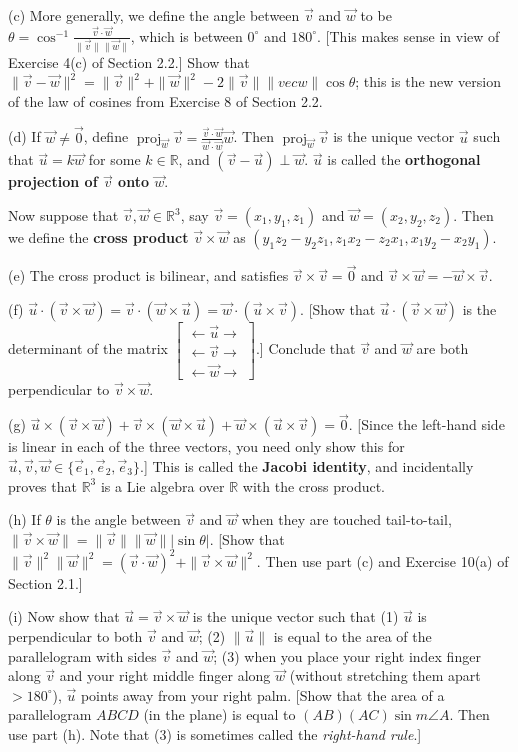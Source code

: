 \documentclass[leqno]{book}
\begin{document}
\begin{enumerate}
(c) More generally, we define the angle between $\vec v$ and $\vec w$ to be $\theta=\cos^{-1}\frac{\vec v\cdot\vec w}{\|\vec v\|\|\vec w\|}$, which is between $0^\circ$ and $180^\circ$.  [This makes sense in view of Exercise 4(c) of Section 2.2.]  Show that $\|\vec v-\vec w\|^2=\|\vec v\|^2+\|\vec w\|^2-2\|\vec v\|\|vec w\|\cos\theta$; this is the new version of the law of cosines from Exercise 8 of Section 2.2.

(d) If $\vec w\ne\vec 0$, define $\operatorname{proj}_{\vec w}\vec v=\frac{\vec v\cdot\vec w}{\vec w\cdot\vec w}\vec w$.  Then $\operatorname{proj}_{\vec w}\vec v$ is the unique vector $\vec u$ such that $\vec u=k\vec w$ for some $k\in\mathbb R$, and $(\vec v-\vec u)\perp\vec w$.  $\vec u$ is called the \textbf{orthogonal projection of $\vec v$ onto $\vec w$}.

Now suppose that $\vec v,\vec w\in\mathbb R^3$, say $\vec v=(x_1,y_1,z_1)$ and $\vec w=(x_2,y_2,z_2)$.  Then we define the \textbf{cross product} $\vec v\times\vec w$ as $(y_1z_2-y_2z_1,z_1x_2-z_2x_1,x_1y_2-x_2y_1)$.

(e) The cross product is bilinear, and satisfies $\vec v\times\vec v=\vec 0$ and $\vec v\times\vec w=-\vec w\times\vec v$.

(f) $\vec u\cdot(\vec v\times\vec w)=\vec v\cdot(\vec w\times\vec u)=\vec w\cdot(\vec u\times\vec v)$.  [Show that $\vec u\cdot(\vec v\times\vec w)$ is the determinant of the matrix $\begin{bmatrix}\leftarrow\vec u\rightarrow\\\leftarrow\vec v\rightarrow\\\leftarrow\vec w\rightarrow\end{bmatrix}$.]  Conclude that $\vec v$ and $\vec w$ are both perpendicular to $\vec v\times\vec w$.

(g) $\vec u\times(\vec v\times\vec w)+\vec v\times(\vec w\times\vec u)+\vec w\times(\vec u\times\vec v)=\vec 0$.  [Since the left-hand side is linear in each of the three vectors, you need only show this for $\vec u,\vec v,\vec w\in\{\vec e_1,\vec e_2,\vec e_3\}$.]  This is called the \textbf{Jacobi identity}, and incidentally proves that $\mathbb R^3$ is a Lie algebra over $\mathbb R$ with the cross product.

(h) If $\theta$ is the angle between $\vec v$ and $\vec w$ when they are touched tail-to-tail, $\|\vec v\times\vec w\|=\|\vec v\|\|\vec w\||\sin\theta|$.  [Show that $\|\vec v\|^2\|\vec w\|^2=(\vec v\cdot\vec w)^2+\|\vec v\times\vec w\|^2$.  Then use part (c) and Exercise 10(a) of Section 2.1.]

(i) Now show that $\vec u=\vec v\times\vec w$ is the unique vector such that (1) $\vec u$ is perpendicular to both $\vec v$ and $\vec w$; (2) $\|\vec u\|$ is equal to the area of the parallelogram with sides $\vec v$ and $\vec w$; (3) when you place your right index finger along $\vec v$ and your right middle finger along $\vec w$ (without stretching them apart $>180^\circ$), $\vec u$ points away from your right palm.  [Show that the area of a parallelogram $ABCD$ (in the plane) is equal to $(AB)(AC)\sin m\angle A$.  Then use part (h).  Note that (3) is sometimes called the \emph{right-hand rule}.]
\end{enumerate}
\end{document}
